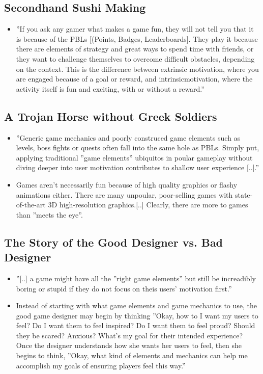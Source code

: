 \subsection{Secondhand Sushi Making}
\begin{itemize}
    \item ''If you ask any gamer what makes a game fun, they will not tell you that it is because of the PBLs [(Points, Badges, Leaderboards]. They play it because there are elements of strategy and great ways to spend time with friends, or they want to challenge themselves to overcome difficult obstacles, depending on the context. This is the difference between extrinsic motivation, where you are engaged because of a goal or reward, and intrinsicmotivation, where the activity itself is fun and exciting, with or without a reward.''
\end{itemize}


\subsection{A Trojan Horse without Greek Soldiers}
\begin{itemize}
    \item ''Generic game mechanics and poorly construced game elements such as levels, boss fights or quests often fall into the same hole as PBLs. Simply put, applying traditional ''game elements'' ubiquitos in poular gameplay without diving deeper into user motivation contributes to shallow user experience [..].''
    \item Games aren't necessarily fun because of high quality graphics or flashy animations either. There are many unpoular, poor-selling games with state-of-the-art 3D high-resolution graphics.[..] Clearly, there are more to games than ''meets the eye''.
\end{itemize}

\subsection{The Story of the Good Designer vs. Bad Designer}
\begin{itemize}
    \item ''[..] a game might have all the ''right game elements'' but still be increadibly boring or stupid if they do not focus on theis users' motivation first.''
    \item Instead of starting with what game elements and game mechanics to use, the good game designer may begin by thinking ''Okay, how to I want my users to feel? Do I want them to feel inspired? Do I want them to feel proud? Should they be scared? Anxious? What's my goal for their intended experience?\\
    Once the designer understands how she wants her users to feel, then she begins to think, ''Okay, what kind of elements and mechanics can help me accomplish my goals of ensuring players feel this way.'' 
\end{itemize}